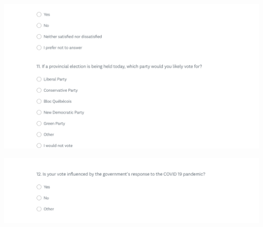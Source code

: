 \documentclass[
]{article}
\begin{document}
\includegraphics{./survey image/1.6.png}

\includegraphics{./survey image/1.7.png}
\end{document}
